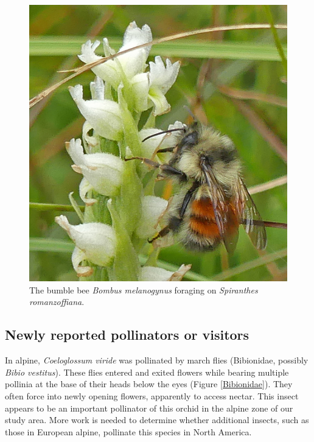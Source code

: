 \begin{multicols}{2}
\begin{figure}[H]
\begin{center}
\vspace{2mm}
\includegraphics[width=\textwidth]{img/Bombus_melanogynus.jpg}
\caption{The bumble bee \emph{Bombus melanogynus} foraging on \emph{Spiranthes romanzoffiana}.}
\label{Bombus_melanogynus}
\end{center}
\end{figure}



\subsection{Newly reported pollinators or visitors}

In alpine, \emph{Coeloglossum viride} was pollinated by march flies
(Bibionidae, possibly \emph{Bibio vestitus}). These flies entered and
exited flowers while bearing multiple pollinia at the base of their
heads below the eyes (Figure \ref{Bibionidae}). They often force into newly opening
flowers, apparently to access nectar. This insect appears to be an
important pollinator of this orchid in the alpine zone of our study
area. More work is needed to determine whether additional insects, such
as those in European alpine, pollinate this species in North America.


\end{multicols}
